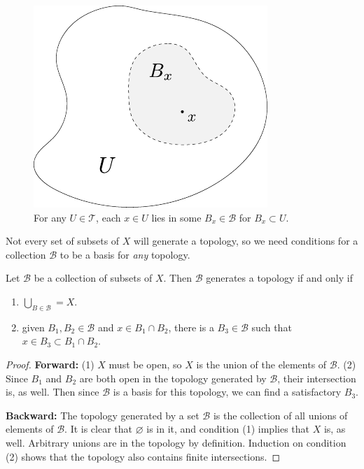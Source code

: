 \documentclass[twoside,10pt]{report}
\begin{document}
\begin{figure}[H]
	\centering
	\includegraphics[scale=0.8]{fig/gen-top.pdf}
	\caption{For any $U \in \mathcal{T}$, each $x \in U$ lies in some $B_x \in \mathcal{B}$ for $B_x \subset U$.}
\end{figure}


Not every set of subsets of $X$ will generate a topology, so we need conditions for a collection $\mathcal{B}$ to be a basis for \textit{any} topology.

\begin{prop}
\label{prop:basis-for-any-top}
Let $\mathcal{B}$ be a collection of subsets of $X$. Then $\mathcal{B}$ generates a topology if and only if
\begin{enumerate}
	\item $\bigcup_{B \in \mathcal{B}}=X$.
	\item given $B_1,B_2 \in \mathcal{B}$ and $x \in B_1 \cap B_2$, there is a $B_3 \in \mathcal{B}$ such that $x \in B_3 \subset B_1 \cap B_2$.
\end{enumerate}
\end{prop}
\begin{proof}
	\textbf{Forward:} (1) $X$ must be open, so $X$ is the union of the elements of $\mathcal{B}$. (2) Since $B_1$ and $B_2$ are both open in the topology generated by $\mathcal{B}$, their intersection is, as well. Then since $\mathcal{B}$ is a basis for this topology, we can find a satisfactory $B_3$.

	\textbf{Backward:} The topology generated by a set $\mathcal{B}$ is the collection of all unions of elements of $\mathcal{B}$. It is clear that $\varnothing$ is in it, and condition (1) implies that $X$ is, as well. Arbitrary unions are in the topology by definition. Induction on condition (2) shows that the topology also contains finite intersections.
\end{proof}
\end{document}
